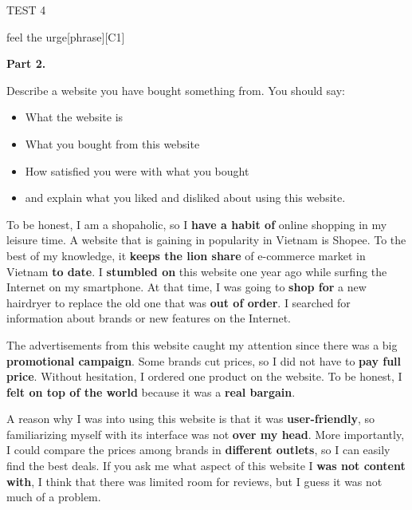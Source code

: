 \begin{glossarymc}[Cambridge 14]
\begin{test}{TEST 4}
\begin{VocabExplain}[Part 1]
            \begin{ExplainCard}{feel the urge}[phrase][C1]
            \end{ExplainCard}
        \end{VocabExplain}

    \noindent
    \textbf{Part 2.}
    \begin{qa}{Describe a website you have bought something from. You should say:}
    \begin{itemize}
        \item What the website is  
        \item What you bought from this website  
        \item How satisfied you were with what you bought  
        \item and explain what you liked and disliked about using this website.  
    \end{itemize}

    To be honest, I am a shopaholic, so I \textbf{have a habit of} online shopping in my leisure time. A website that is gaining in popularity in Vietnam is Shopee. To the best of my knowledge, it \textbf{keeps the lion share} of e-commerce market in Vietnam \textbf{to date}. I \textbf{stumbled on} this website one year ago while surfing the Internet on my smartphone. At that time, I was going to \textbf{shop for} a new hairdryer to replace the old one that was \textbf{out of order}. I searched for information about brands or new features on the Internet.  

    The advertisements from this website caught my attention since there was a big \textbf{promotional campaign}. Some brands cut prices, so I did not have to \textbf{pay full price}. Without hesitation, I ordered one product on the website. To be honest, I \textbf{felt on top of the world} because it was a \textbf{real bargain}.  

    A reason why I was into using this website is that it was \textbf{user-friendly}, so familiarizing myself with its interface was not \textbf{over my head}. More importantly, I could compare the prices among brands in \textbf{different outlets}, so I can easily find the best deals. If you ask me what aspect of this website I \textbf{was not content with}, I think that there was limited room for reviews, but I guess it was not much of a problem.
    \end{qa}


\end{test}
\end{glossarymc}

